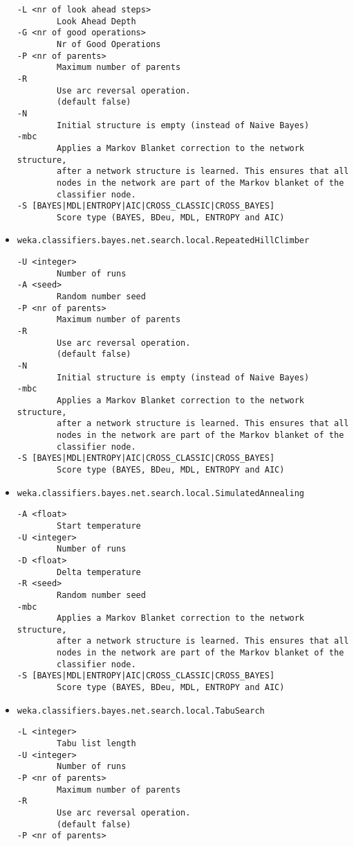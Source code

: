 \begin{itemize}
\begin{verbatim}
-L <nr of look ahead steps>
        Look Ahead Depth
-G <nr of good operations>
        Nr of Good Operations
-P <nr of parents>
        Maximum number of parents
-R
        Use arc reversal operation.
        (default false)
-N
        Initial structure is empty (instead of Naive Bayes)
-mbc
        Applies a Markov Blanket correction to the network structure,
        after a network structure is learned. This ensures that all
        nodes in the network are part of the Markov blanket of the
        classifier node.
-S [BAYES|MDL|ENTROPY|AIC|CROSS_CLASSIC|CROSS_BAYES]
        Score type (BAYES, BDeu, MDL, ENTROPY and AIC)
  \end{verbatim}
\item \texttt{weka.classifiers.bayes.net.search.local.RepeatedHillClimber}
  \begin{verbatim}
-U <integer>
        Number of runs
-A <seed>
        Random number seed
-P <nr of parents>
        Maximum number of parents
-R
        Use arc reversal operation.
        (default false)
-N
        Initial structure is empty (instead of Naive Bayes)
-mbc
        Applies a Markov Blanket correction to the network structure,
        after a network structure is learned. This ensures that all
        nodes in the network are part of the Markov blanket of the
        classifier node.
-S [BAYES|MDL|ENTROPY|AIC|CROSS_CLASSIC|CROSS_BAYES]
        Score type (BAYES, BDeu, MDL, ENTROPY and AIC)
  \end{verbatim}
\item \texttt{weka.classifiers.bayes.net.search.local.SimulatedAnnealing}
  \begin{verbatim}
-A <float>
        Start temperature
-U <integer>
        Number of runs
-D <float>
        Delta temperature
-R <seed>
        Random number seed
-mbc
        Applies a Markov Blanket correction to the network structure,
        after a network structure is learned. This ensures that all
        nodes in the network are part of the Markov blanket of the
        classifier node.
-S [BAYES|MDL|ENTROPY|AIC|CROSS_CLASSIC|CROSS_BAYES]
        Score type (BAYES, BDeu, MDL, ENTROPY and AIC)
  \end{verbatim}
\item \texttt{weka.classifiers.bayes.net.search.local.TabuSearch}
  \begin{verbatim}
-L <integer>
        Tabu list length
-U <integer>
        Number of runs
-P <nr of parents>
        Maximum number of parents
-R
        Use arc reversal operation.
        (default false)
-P <nr of parents>

\end{verbatim}
\end{itemize}
